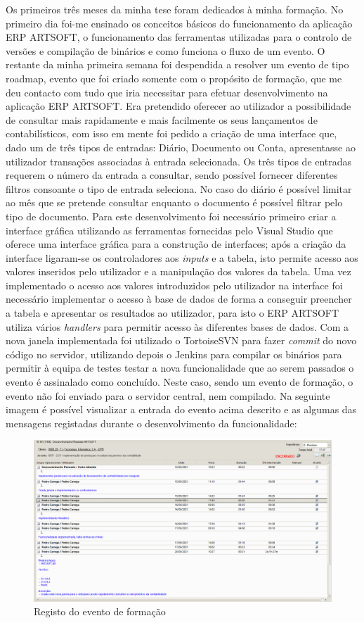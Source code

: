 \documentclass[sigplan]{acmart}
\begin{document}
Os primeiros três meses da minha tese foram dedicados à minha formação. No primeiro dia foi-me ensinado os conceitos básicos do funcionamento da aplicação ERP ARTSOFT, o funcionamento das ferramentas utilizadas para o controlo de versões e compilação de binários e como funciona o fluxo de um evento. O restante da minha primeira semana foi despendida a resolver um evento de tipo roadmap, evento que foi criado somente com o propósito de formação, que me deu contacto com tudo que iria necessitar para efetuar desenvolvimento na aplicação ERP ARTSOFT. Era pretendido oferecer ao utilizador a possibilidade de consultar mais rapidamente e mais facilmente os seus lançamentos de contabilísticos, com isso em mente foi pedido a criação de uma interface que, dado um de três tipos de entradas: Diário, Documento ou Conta, apresentasse ao utilizador transações associadas à entrada selecionada. Os três tipos de entradas requerem o número da entrada a consultar, sendo possível fornecer diferentes filtros consoante o tipo de entrada seleciona. No caso do diário é possível limitar ao mês que se pretende consultar enquanto o documento é possível filtrar pelo tipo de documento. Para este desenvolvimento foi necessário primeiro criar a interface gráfica utilizando as ferramentas fornecidas pelo Visual Studio que oferece uma interface gráfica para a construção de interfaces; após a criação da interface ligaram-se os controladores aos \textit{inputs} e a tabela, isto permite acesso aos valores inseridos pelo utilizador e a manipulação dos valores da tabela. Uma vez implementado o acesso aos valores introduzidos pelo utilizador na interface foi necessário implementar o acesso à base de dados de forma a conseguir preencher a tabela e apresentar os resultados ao utilizador, para isto o ERP ARTSOFT utiliza vários \textit{handlers} para permitir acesso às diferentes bases de dados. Com a nova janela implementada foi utilizado o TortoiseSVN para fazer \textit{commit} do novo código no servidor, utilizando depois o Jenkins para compilar os binários para permitir à equipa de testes testar a nova funcionalidade que ao serem passados o evento é assinalado como concluído. Neste caso, sendo um evento de formação, o evento não foi enviado para o servidor central, nem compilado. Na seguinte imagem é possível visualizar a entrada do evento acima descrito e as algumas das mensagens registadas durante o desenvolvimento da funcionalidade:
\FloatBarrier
\begin{figure}[htbp]
	\centerline{\includegraphics[width=\linewidth]{figures/evento_formacao.png}}
	\caption{Registo do evento de formação}
	\label{fig2}
\end{figure}
\end{document}
